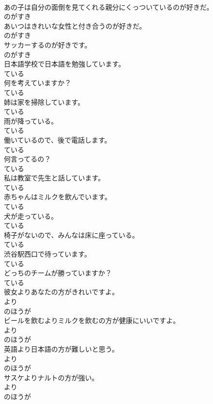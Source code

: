 \documentclass[8pt]{extreport}
\begin{document}
\begin{CJK}{UTF8}{min}
\\	あの子は自分の面倒を見てくれる親分にくっついているのが好きだ。	
\\	のがすき	
\\	あいつはきれいな女性と付き合うのが好きだ。	
\\	のがすき	
\\	サッカーするのが好きです。	
\\	のがすき	
\\	日本語学校で日本語を勉強しています。	
\\	ている	
\\	何を考えていますか？	
\\	ている	
\\	姉は家を掃除しています。	
\\	ている	
\\	雨が降っている。	
\\	ている	
\\	働いているので、後で電話します。	
\\	ている	
\\	何言ってるの？	
\\	ている	
\\	私は教室で先生と話しています。	
\\	ている	
\\	赤ちゃんはミルクを飲んでいます。	
\\	ている	
\\	犬が走っている。	
\\	ている	
\\	椅子がないので、みんなは床に座っている。	
\\	ている	
\\	渋谷駅西口で待っています。	
\\	ている	
\\	どっちのチームが勝っていますか？	
\\	ている	
\\	彼女よりあなたの方がきれいですよ。	
\\	より 
\\	のほうが 
\\	ビールを飲むよりミルクを飲むの方が健康にいいですよ。	
\\	より 
\\	のほうが 
\\	英語より日本語の方が難しいと思う。	
\\	より 
\\	のほうが 
\\	サスケよりナルトの方が強い。	
\\	より 
\\	のほうが 

\end{CJK}
\end{document}
